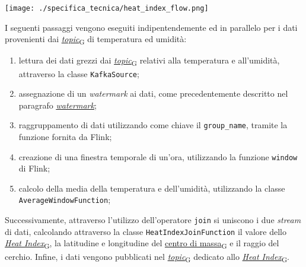 \begin{center}
	\texttt{[image: ./specifica\_tecnica/heat\_index\_flow.png]}
\end{center}
I seguenti passaggi vengono eseguiti indipentendemente ed in parallelo per i dati provenienti dai \href{https://7last.github.io/docs/pb/documentazione-interna/glossario\#topic}{\textit{topic}\textsubscript{G}} di temperatura ed umidità:
\begin{enumerate}
	\item lettura dei dati grezzi dai \href{https://7last.github.io/docs/pb/documentazione-interna/glossario\#topic}{\textit{topic}\textsubscript{G}} relativi alla temperatura e all'umidità, attraverso la classe \texttt{KafkaSource};
	\item assegnazione di un \textit{watermark} ai dati, come precedentemente descritto nel paragrafo \hyperref[watermark]{\underline{\textit{watermark}}};
	\item raggruppamento di dati utilizzando come chiave il \texttt{group\_name}, tramite la funzione \texttt{} fornita da Flink;
	\item creazione di una finestra temporale di un'ora, utilizzando la funzione \texttt{window} di Flink;
	\item calcolo della media della temperatura e dell'umidità, utilizzando la classe \\\texttt{AverageWindowFunction};
\end{enumerate}
Successivamente, attraverso l'utilizzo dell'operatore \texttt{join} si uniscono i due \textit{stream} di dati, calcolando
attraverso la classe \texttt{HeatIndexJoinFunction} il valore dello \href{https://7last.github.io/docs/pb/documentazione-interna/glossario\#heat-index}{\textit{Heat Index}\textsubscript{G}}, la latitudine e longitudine del \href{https://7last.github.io/docs/pb/documentazione-interna/glossario\#centro-di-massa}{centro di massa\textsubscript{G}} e il raggio del cerchio.
Infine, i dati vengono pubblicati nel \href{https://7last.github.io/docs/pb/documentazione-interna/glossario\#topic}{\textit{topic}\textsubscript{G}} dedicato allo \href{https://7last.github.io/docs/pb/documentazione-interna/glossario\#heat-index}{\textit{Heat Index}\textsubscript{G}}.

